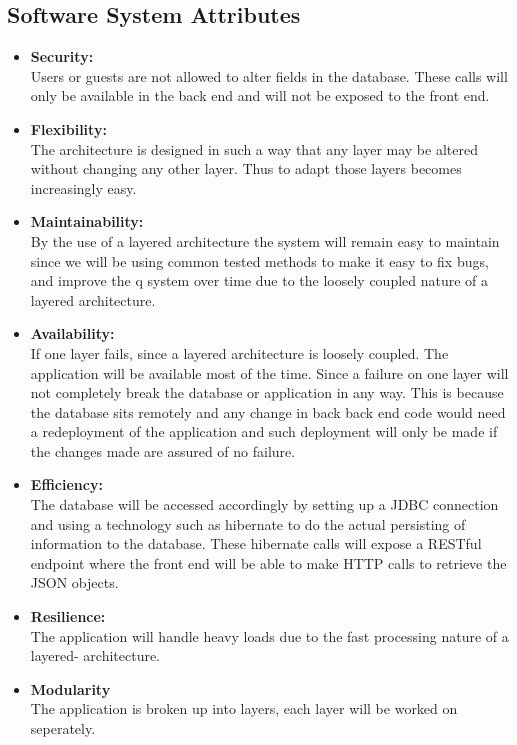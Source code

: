 \documentclass{article}
\begin{document}
\subsection{Software System Attributes}
	\begin{itemize}
		\item \textbf{Security:}
		\\Users or guests are not allowed to alter fields in the database. These calls will only be available in the back end and will not be exposed to the front end.
		
		\item \textbf{Flexibility:}
		\\The architecture is designed in such a way that any layer  may be altered without changing any other layer. Thus to adapt those layers becomes increasingly easy.
		
		\item \textbf{Maintainability:}
		\\By the use of a layered architecture the system will remain easy to maintain since we will be using common tested methods to make it easy to fix bugs, and improve the q		system over time due to the loosely coupled nature of a layered architecture.

		
		\item \textbf{Availability:}
		\\If one layer fails, since a layered architecture is loosely coupled. The application will be available most of the time. Since a failure on one layer will not completely break the database or application in any way. This is because the database sits remotely and any change in back back end code would need a redeployment of the application and such deployment will only be made if the changes made are assured of no failure.
		
		\item \textbf{Efficiency:}
		\\The database will be accessed accordingly by setting up a JDBC connection and using a technology such as hibernate to do the actual persisting of information to the database. These hibernate calls will expose a RESTful endpoint where the front end will be able to make HTTP calls to retrieve the JSON objects.
		
		\item \textbf{Resilience:}
		\\The application will handle heavy loads due to the fast processing nature of a layered- architecture.
		
		\item \textbf{Modularity}
		\\The application is broken up into layers, each layer will be worked on seperately.
	\end{itemize}
\end{document}

